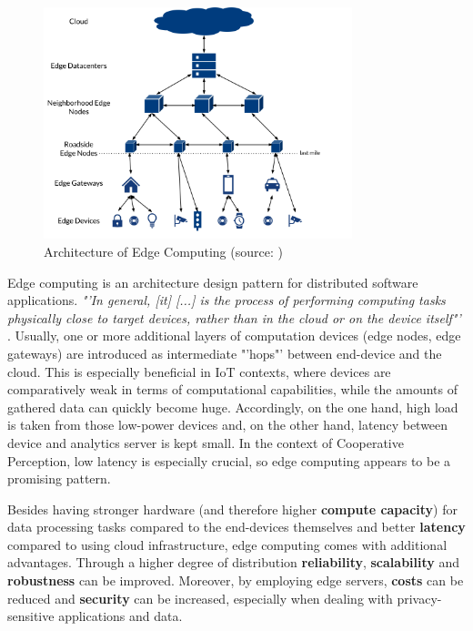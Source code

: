 \begin{figure}
	\centering
	\includegraphics[width=0.8\textwidth]{98_images/edge.png}
	\caption{Architecture of Edge Computing (source: \cite{Bischoff2019})}
	\label{fig:edge_computing}
\end{figure}

Edge computing is an architecture design pattern for distributed software applications. \textit{"'In general, [it] [...] is the process of performing computing tasks physically close to target devices, rather than in the cloud or on the device itself"'} \cite{Bischoff2019}. Usually, one or more additional layers of computation devices (edge nodes, edge gateways) are introduced as intermediate "'hops"' between end-device and the cloud. This is especially beneficial in IoT contexts, where devices are comparatively weak in terms of computational capabilities, while the amounts of gathered data can quickly become huge. Accordingly, on the one hand, high load is taken from those low-power devices and, on the other hand, latency between device and analytics server is kept small. In the context of Cooperative Perception, low latency is especially crucial, so edge computing appears to be a promising pattern.

Besides having stronger hardware (and therefore higher \textbf{compute capacity}) for data processing tasks compared to the end-devices themselves and better \textbf{latency} compared to using cloud infrastructure, edge computing comes with additional advantages. Through a higher degree of distribution \textbf{reliability}, \textbf{scalability} and \textbf{robustness} can be improved. Moreover, by employing edge servers, \textbf{costs} can be reduced and \textbf{security} can be increased, especially when dealing with privacy-sensitive applications and data. 

